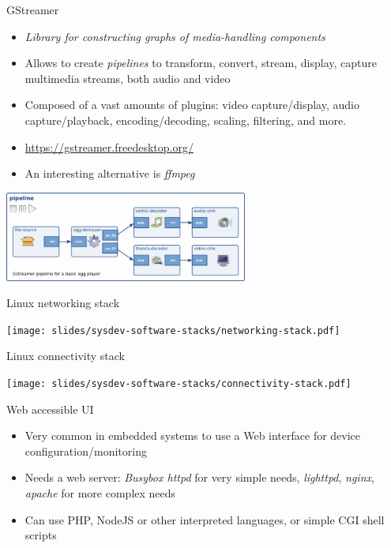 \begin{frame}{GStreamer}
  \begin{itemize}
  \item {\em Library for constructing graphs of media-handling components}
  \item Allows to create {\em pipelines} to transform, convert,
    stream, display, capture multimedia streams, both audio and video
  \item Composed of a vast amounts of plugins: video capture/display,
    audio capture/playback, encoding/decoding, scaling, filtering, and
    more.
  \item \url{https://gstreamer.freedesktop.org/}
  \item An interesting alternative is {\em ffmpeg}
  \end{itemize}

  \begin{center}
    \includegraphics[width=0.6\textwidth]{slides/sysdev-software-stacks/gstreamer-pipeline.png}
  \end{center}
\end{frame}

\begin{frame}{Linux networking stack}
  \begin{center}
    \texttt{[image: slides/sysdev-software-stacks/networking-stack.pdf]}
  \end{center}
\end{frame}

\begin{frame}{Linux connectivity stack}
  \begin{center}
    \texttt{[image: slides/sysdev-software-stacks/connectivity-stack.pdf]}
  \end{center}
\end{frame}

\begin{frame}{Web accessible UI}
  \begin{itemize}
  \item Very common in embedded systems to use a Web interface for
    device configuration/monitoring
  \item Needs a web server: {\em Busybox httpd} for very simple needs,
    {\em lighttpd}, {\em nginx}, {\em apache} for more complex needs
  \item Can use PHP, NodeJS or other interpreted languages, or simple
    CGI shell scripts
  \end{itemize}
\end{frame}

